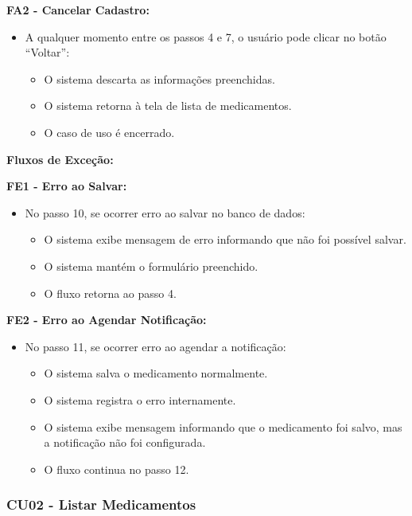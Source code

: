 \documentclass[12pt]{article}
\begin{document}
\textbf{FA2 - Cancelar Cadastro:}
\begin{itemize}
    \item A qualquer momento entre os passos 4 e 7, o usuário pode clicar no botão ``Voltar'':
    \begin{itemize}
        \item O sistema descarta as informações preenchidas.
        \item O sistema retorna à tela de lista de medicamentos.
        \item O caso de uso é encerrado.
    \end{itemize}
\end{itemize}

\textbf{Fluxos de Exceção:}

\textbf{FE1 - Erro ao Salvar:}
\begin{itemize}
    \item No passo 10, se ocorrer erro ao salvar no banco de dados:
    \begin{itemize}
        \item O sistema exibe mensagem de erro informando que não foi possível salvar.
        \item O sistema mantém o formulário preenchido.
        \item O fluxo retorna ao passo 4.
    \end{itemize}
\end{itemize}

\textbf{FE2 - Erro ao Agendar Notificação:}
\begin{itemize}
    \item No passo 11, se ocorrer erro ao agendar a notificação:
    \begin{itemize}
        \item O sistema salva o medicamento normalmente.
        \item O sistema registra o erro internamente.
        \item O sistema exibe mensagem informando que o medicamento foi salvo, mas a notificação não foi configurada.
        \item O fluxo continua no passo 12.
    \end{itemize}
\end{itemize}

\subsubsection{CU02 - Listar Medicamentos}
\end{document}

